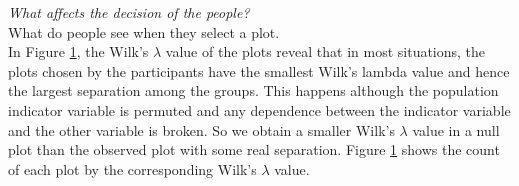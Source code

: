 \documentclass[12]{article}
\begin{document}
\Large{\textit{What affects the decision of the people?}} \\[0.2cm]

\normalsize
{\color{red} What do people see when they select a plot.} \\

In Figure \ref{wilks-count}, the Wilk's $\lambda$ value of the plots reveal that in most situations, the plots chosen by the participants have the smallest Wilk's lambda value and hence the largest separation among the groups. This happens although the population indicator variable is permuted and any dependence between the indicator variable and the other variable is broken. So we obtain a smaller Wilk's $\lambda$ value in a null plot than the observed plot with some real separation. Figure \ref{wilks-count} shows the count of each plot by the corresponding Wilk's $\lambda$ value. 

\begin{figure}[hbtp]
   \centering
       \label{wilks-count}
\end{figure}
\end{document}

